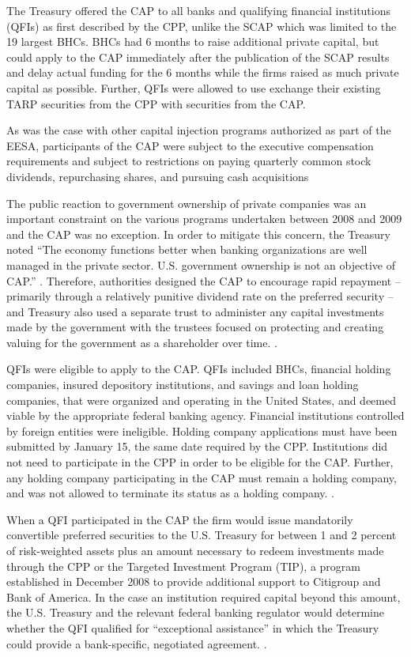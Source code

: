 \documentclass[12pt]{article}
\begin{document}
The Treasury offered the CAP to all banks and qualifying financial institutions (QFIs) as first described by the CPP, unlike the SCAP which was limited to the 19 largest BHCs. BHCs had 6 months to raise additional private capital, but could apply to the CAP immediately after the publication of the SCAP results and delay actual funding for the 6 months while the firms raised as much private capital as possible. Further, QFIs were allowed to use exchange their existing TARP securities from the CPP with securities from the CAP. 

As was the case with other capital injection programs authorized as part of the EESA, participants of the CAP were subject to the executive compensation requirements and subject to restrictions on paying quarterly common stock dividends, repurchasing shares, and pursuing cash acquisitions

The public reaction to government ownership of private companies was an important constraint on the various programs undertaken between 2008 and 2009 and the CAP was no exception. In order to mitigate this concern, the Treasury noted ``The economy functions better when banking organizations are well managed in the private sector. U.S. government ownership is not an objective of CAP.'' \citep{WhitePaper}. Therefore, authorities designed the CAP to encourage rapid repayment -- primarily through a relatively punitive dividend rate on the preferred security -- and Treasury also used a separate trust to administer any capital investments made by the government with the trustees focused on protecting and creating valuing for the government as a shareholder over time. \citep{WhitePaper}.

QFIs were eligible to apply to the CAP. QFIs included BHCs, financial holding companies, insured depository institutions, and savings and loan holding companies, that were organized and operating in the United States, and deemed viable by the appropriate federal banking agency. Financial institutions controlled by foreign entities were ineligible. Holding company applications must have been submitted by January 15, the same date required by the CPP. Institutions did not need to participate in the CPP in order to be eligible for the CAP. Further, any holding company participating in the CAP must remain a holding company, and was not allowed to terminate its status as a holding company. \citep{WhitePaper}.

When a QFI participated in the CAP the firm would issue mandatorily convertible preferred securities to the U.S. Treasury for between 1 and 2 percent of risk-weighted assets plus an amount necessary to redeem investments made through the CPP or the Targeted Investment Program (TIP), a program established in December 2008 to provide additional support to Citigroup and Bank of America. In the case an institution required capital beyond this amount, the U.S. Treasury and the relevant federal banking regulator would determine whether the QFI qualified for ``exceptional assistance'' in which the Treasury could provide a bank-specific, negotiated agreement. \citep{WhitePaper}.
\end{document}
